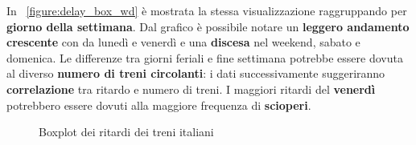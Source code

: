 \documentclass[12pt,a4paper,italian]{report}
\begin{document}
In \figurename~\ref{figure:delay_box_wd} è mostrata la stessa
visualizzazione raggruppando per \textbf{giorno della settimana}.  Dal
grafico è possibile notare un \textbf{leggero andamento crescente} con
da lunedì e venerdì e una \textbf{discesa} nel weekend, sabato e
domenica.  Le differenze tra giorni feriali e fine settimana potrebbe
essere dovuta al diverso \textbf{numero di treni circolanti}: i dati
successivamente suggeriranno \textbf{correlazione} tra ritardo e
numero di treni.  I maggiori ritardi del \textbf{venerdì} potrebbero
essere dovuti alla maggiore frequenza di \textbf{scioperi}.

\begin{figure}[p] \centering
     \vspace{5mm}
    \caption{Boxplot dei ritardi dei treni italiani}
\end{figure}
\end{document}

